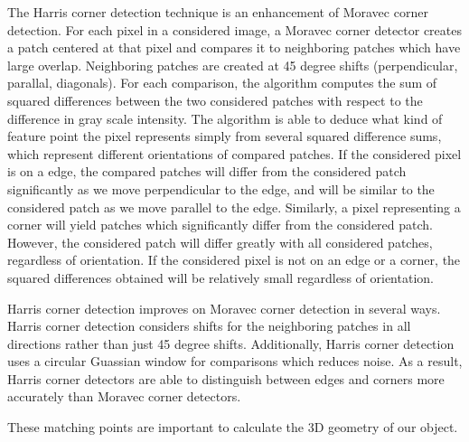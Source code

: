 The Harris corner detection technique is an enhancement of Moravec corner detection. For each pixel in a considered image, a Moravec corner detector creates a patch centered at that pixel and compares it to neighboring patches which have large overlap. Neighboring patches are created at 45 degree shifts (perpendicular, parallal, diagonals). For each comparison, the algorithm computes the sum of squared differences between the two considered patches with respect to the difference in gray scale intensity. The algorithm is able to deduce what kind of feature point the pixel represents simply from several squared difference sums, which represent different orientations of compared patches. If the considered pixel is on a edge, the compared patches will differ from the considered patch significantly as we move perpendicular to the edge, and will be similar to the considered patch as we move parallel to the edge. Similarly, a pixel representing a corner will yield patches which significantly differ from the considered patch. However, the considered patch will differ greatly with all considered patches, regardless of orientation. If the considered pixel is not on an edge or a corner, the squared differences obtained will be relatively small regardless of orientation. 

Harris corner detection improves on Moravec corner detection in several ways. Harris corner detection considers shifts for the neighboring patches in all directions rather than just 45 degree shifts. Additionally, Harris corner detection uses a circular Guassian window for comparisons which reduces noise. As a result, Harris corner detectors are able to distinguish between edges and corners more accurately than Moravec corner detectors.   

These matching points are important to calculate the 3D geometry of our object.
